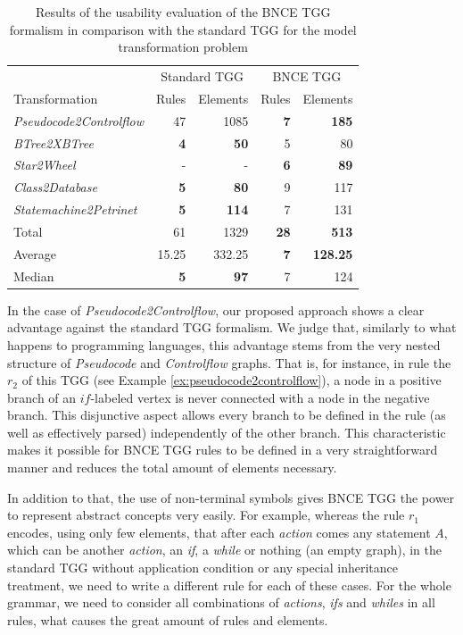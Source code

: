 \begin{table}[h]
	\centering
	\caption{Results of the usability evaluation of the BNCE TGG formalism in comparison with the standard TGG for the model transformation problem}
	\label{tab:formalism-eval}
	\begin{tabular}{l r r r r }
		\hline
										& \multicolumn{2}{c}{Standard TGG}	& \multicolumn{2}{c}{BNCE TGG}\\
		Transformation 					& Rules 		& Elements 		& Rules 		& Elements\\
		\hline
		\emph{Pseudocode2Controlflow}	& 47			& 1085			& \textbf{7}	& \textbf{185}	\\
		\emph{BTree2XBTree}				& \textbf{4}	& \textbf{50}	& 5				& 80 			\\
		\emph{Star2Wheel}				& -				& -				& \textbf{6} 	& \textbf{89} 	\\
		\emph{Class2Database}			& \textbf{5}	& \textbf{80}	& 9 			& 117  			\\
		\emph{Statemachine2Petrinet}	& \textbf{5}	& \textbf{114}	& 7				& 131 			\\
		\hline
		Total							& 61 			& 1329			& \textbf{28}	& \textbf{513}	\\
		Average							& 15.25 		& 332.25		& \textbf{7}	& \textbf{128.25}\\
		Median							& \textbf{5}	& \textbf{97}	& 7				& 124			\\
		\hline
	\end{tabular}
\end{table}

In the case of \emph{Pseudocode2Controlflow}, our proposed approach shows a clear advantage against the standard TGG formalism. We judge that, similarly to what happens to programming languages, this advantage stems from the very nested structure of \emph{Pseudocode} and \emph{Controlflow} graphs. That is, for instance, in rule the $r_2$ of this TGG (see Example \ref{ex:pseudocode2controlflow}), a node in a positive branch of an $if$-labeled vertex is never connected with a node in the negative branch. This disjunctive aspect allows every branch to be defined in the rule (as well as effectively parsed) independently of the other branch. This characteristic makes it possible for BNCE TGG rules to be defined in a very straightforward manner and reduces the total amount of elements necessary.

In addition to that, the use of non-terminal symbols gives BNCE TGG the power to represent abstract concepts very easily. For example, whereas the rule $r_1$ encodes, using only few elements, that after each \emph{action} comes any statement $A$, which can be another \emph{action}, an \emph{if}, a \emph{while} or nothing (an empty graph), in the standard TGG without application condition or any special inheritance treatment, we need to write a different rule for each of these cases. For the whole grammar, we need to consider all combinations of \emph{actions}, \emph{ifs} and \emph{whiles} in all rules, what causes the great amount of rules and elements.

